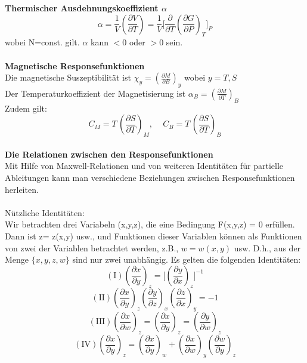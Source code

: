 \documentclass[a4paper,11pt]{scrartcl}
\begin{document}
\textbf{Thermischer Ausdehnungskoeffizient $\alpha$}\\
\begin{equation}
 \alpha = \frac{1}{V} \left( \frac{\partial V}{\partial T} \right) = \frac{1}{V} \lbrack \frac{\partial}{\partial T} \left( \frac{\partial G}{\partial P} \right)_T \rbrack_P
\end{equation}
wobei N=const. gilt. $\alpha$ kann $<0$ oder $>0$ sein. \\
\\
\textbf{Magnetische Responsefunktionen}\\
Die magnetische Suszeptibilität ist $\chi_y = \left( \frac{\partial M}{ \partial B} \right)_y $ wobei $y= T, S$\\
Der Temperaturkoeffizient der Magnetisierung ist $\alpha_B = \left( \frac{\partial M }{\partial T} \right)_B$\\
Zudem gilt:
$$ C_M= T\, \left( \frac{\partial S}{\partial T} \right)_M, \,\, \,\,\,\,\, C_B= T \, \left( \frac{\partial S}{\partial T} \right)_B $$
\\
\textbf{Die Relationen zwischen den Responsefunktionen}\\
Mit Hilfe von Maxwell-Relationen und von weiteren Identitäten für partielle Ableitungen kann man verschiedene Beziehungen zwischen Responsefunktionen herleiten.\\
\\
Nützliche Identitäten:\\
Wir betrachten drei Variabeln (x,y,z), die eine Bedingung F(x,y,z) = 0 erfüllen. Dann ist z= z(x,y) usw., und Funktionen dieser Variablen können als Funktionen von zwei der Variablen betrachtet werden, z.B., $w = w(x,y)$ usw. D.h., aus der Menge $\lbrace x, y,z,w \rbrace$  sind nur zwei unabhängig. Es gelten die folgenden Identitäten:\\
\begin{equation}
 \mathrm{(I)} \left( \frac{\partial x}{ \partial y} \right)_z = \lbrack \left( \frac{\partial y}{\partial x} \right)_z \rbrack^{-1}
\end{equation}
\begin{equation}
  \mathrm{(II)} \left( \frac{\partial x}{ \partial y} \right)_z \left( \frac{\partial y}{ \partial z} \right)_x \left( \frac{\partial z}{ \partial x} \right)_y = -1
\end{equation}
\begin{equation}
 \mathrm{(III)} \left( \frac{\partial x}{ \partial w} \right)_z = \left( \frac{\partial x}{ \partial y} \right)_z = \left( \frac{\partial y}{ \partial w} \right)_z
\end{equation}
\begin{equation}
 \mathrm{(IV)} \left( \frac{\partial x}{ \partial y} \right)_z = \left( \frac{\partial x}{ \partial y} \right)_w + \left( \frac{\partial x}{ \partial w} \right)_y \left( \frac{\partial w}{ \partial y} \right)_z
\end{equation}
\end{document}
